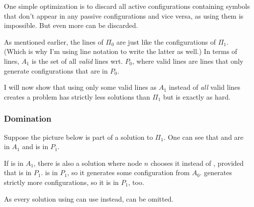 \documentclass[english, 12pt, a4paper, sci, a-1b, online]{aaltothesis}
\begin{document}
One simple optimization is to discard all active configurations containing symbols that don't appear in any passive configurations and vice versa, as using them is impossible. But even more can be discarded.

As mentioned earlier, the lines of $\Pi_0$ are just like the configurations of $\Pi_1$. (Which is why I'm using line notation to write the latter as well.) In terms of lines, $A_1$ is the set of all \emph{valid} lines wrt. $P_0$, where valid lines are lines that only generate configurations that are in $P_0$.

I will now show that using only some valid lines as $A_1$ instead of \emph{all} valid lines creates a problem has strictly less solutions than $\Pi_1$ but is exactly as hard.

\subsubsection{Domination}

Suppose the picture below is part of a solution to $\Pi_{1}$. One can see that  and  are in $A_{1}$ and  is in $P_{1}$.


If  is in $A_{1}$, there is also a solution where node $n$ chooses it instead of , provided that  is in $P_{1}$.  is in $P_{1}$, so it generates some configuration from $A_{0}$.  generates strictly more configurations, so it is in $P_{1}$, too.


As every solution using  can use  instead,  can be omitted.
\end{document}
